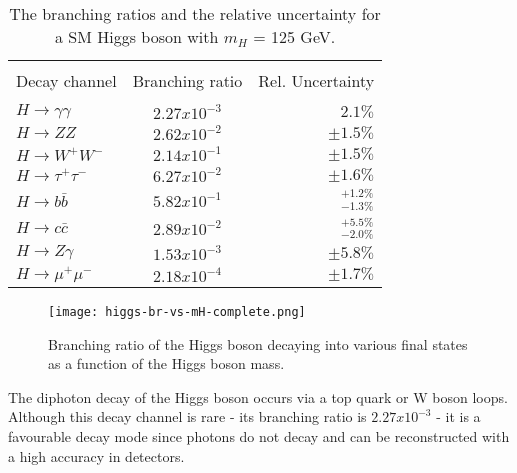 \begin{table*}[ht]
	{\setlength{\tabcolsep}{14pt}
		\caption[The branching ratios and the relative uncertainty for a SM Higgs boson with $m_H$ = 125 GeV.]{The branching ratios and the relative uncertainty for a SM Higgs boson with $m_H$ = 125 GeV\cite{higgs-br-vs-mH, higg-phen-3}.}
		\begin{center}
			\vspace{-6mm}
			\begin{tabular}{lcr}
				\hline \\[-2.45ex] \hline \\[-2.1ex]
				Decay channel & Branching ratio & Rel. Uncertainty \\
				\hline \\[-1.8ex]
                $H\rightarrow \gamma\gamma$ & $2.27x10^{-3}$ & $2.1\%$\\
                $H\rightarrow ZZ$ & $2.62x10^{-2}$ & $\pm 1.5\%$\\
                $H\rightarrow W^+W^-$ & $2.14x10^{-1}$ &$\pm 1.5\%$ \\
                $H\rightarrow \tau^+\tau^-$ & $6.27x10^{-2}$ &$\pm 1.6\%$ \\
                $H\rightarrow b\bar b$ & $5.82x10^{-1}$ & $^{+1.2\%}_{-1.3\%}$\\
                $H\rightarrow c \bar c$ & $2.89x10^{-2}$ &$^{+5.5\%}_{-2.0\%}$ \\
                $H\rightarrow Z\gamma$ & $1.53x10^{-3}$ & $\pm 5.8\%$\\
                $H\rightarrow \mu^+\mu^-$ & $2.18x10^{-4}$ &$\pm 1.7\%$ \\
				\hline
			\end{tabular}
			\vspace{-6mm}
		\end{center}
		\label{HiggsBRtable}}
\end{table*}

\begin{figure}[ht]
	\centering
	\texttt{[image: higgs-br-vs-mH-complete.png]}
	\caption[Branching ratio of the Higgs boson decaying into various final states as a function of the Higgs boson mass.]{Branching ratio of the Higgs boson decaying into various final states as a function of the Higgs boson mass\cite{higg-phen-3}.}
	\label{higgs-br-vs-mH-complete}
\end{figure}


The diphoton decay of the Higgs boson occurs via a top quark or W boson loops. Although this decay channel is rare - its branching ratio is $2.27x10^{-3}$ - it is a favourable decay mode since photons do not decay and can be reconstructed with a high accuracy in detectors.


